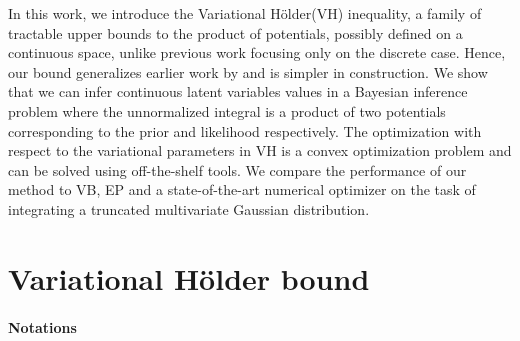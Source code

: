 \documentclass[reqno,oneside,letterpaper,10pt]{article}
\newcommand{\Holder}{H\"older\xspace}
\newcommand{\LSE}[3]{\bar{\mathbb{E}}_{#1}^{#2}\left[#3\right]}
\newcommand{\Expectation}[2]{\int{#2}d\nu(\Z)}
\def\Z{Z}
\begin{document}
In this work, we introduce the Variational \Holder (VH) inequality, a family of tractable upper bounds to the product
of potentials, possibly defined on a continuous space, unlike previous work focusing %
only on the discrete case. Hence, our bound generalizes earlier work by \citet{liu11d} and is simpler in construction.  
{We show that we can infer continuous latent variables values in a Bayesian inference problem where the unnormalized integral is a product of two potentials corresponding to the prior and likelihood respectively. The optimization with respect to the variational parameters in VH is a convex optimization problem and can be solved using off-the-shelf tools. We compare the performance of our method to VB, EP and a state-of-the-art numerical optimizer on the task of integrating a truncated multivariate Gaussian distribution.}



\section{Variational \Holder bound}
\label{sec:vh}


\paragraph{Notations}
\end{document}
